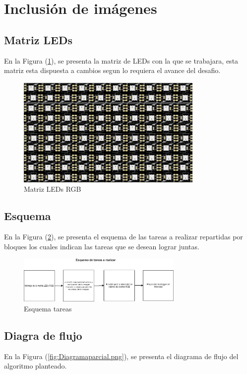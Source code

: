 \documentclass{article}
\begin{document}
\section{Inclusión de imágenes} \label{imagenes}
\subsection{Matriz LEDs}
En la Figura (\ref{fig:Matriz leds.png}), se presenta la matriz de LEDs con la que se trabajara, esta matriz esta dispuesta a cambios segun lo requiera el avance del desafio.

\begin{figure}[h]
\includegraphics[width=9cm]{Matriz leds.png}
\centering
\caption{Matriz LEDs RGB}
\label{fig:Matriz leds.png}
\end{figure}

\subsection{Esquema}
En la Figura (\ref{fig:Tareas a realizarpng}), se presenta el esquema de las tareas a realizar repartidas por bloques los cuales indican las tareas que se desean lograr juntas.

\begin{figure}[h]
\includegraphics[width=8cm]{Tareas a realizar.png}
\centering
\caption{Esquema tareas}
\label{fig:Tareas a realizarpng}
\end{figure}

\subsection{Diagra de flujo}
En la Figura (\ref{fig:Diagramaparcial.png}), se presenta el diagrama de flujo del algoritmo planteado.
\end{document}
